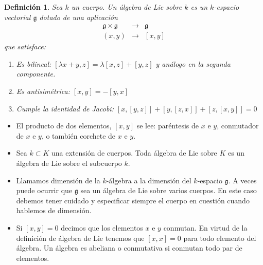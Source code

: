 \documentclass[a4paper,draft,12pt]{scrartcl}
\newtheorem{defi}{Definición}[section]%
\newcommand{\g}{\mathfrak{g}}%
\newcommand{\lto}{\longrightarrow}%
\newcommand{\df}[1]{\textsf{\color{blue}#1}}
\begin{document}
\begin{defi}

Sea  $k$  un cuerpo. Un  \df{álgebra de Lie}  sobre  $k$ es un  $k$-espacio vectorial $\g$ dotado de una aplicación
\[
\begin{array}{ccc}
 \g \times \g & \lto & \g \\
  (x,y)& \lto & [x,y]
\end{array}
\]
que satisface:

\begin{enumerate}[\indent 1.-]

 \item  Es bilineal: $[\lambda x+y,z]= \lambda[x,z]+[y,z]$ y análogo en la segunda componente.

\item  Es antisimétrica: $ [x, y ] = - [y,x ]$

\item   Cumple la   \df{identidad de Jacobi}:\label{identidad de Jacobi} $[x,[y,z ]  ] +[y,[z,x ]  ] + [z,[x,y ]  ]=0$ 

\end{enumerate}

\end{defi}




\begin{itemize}

\item El producto de dos elementos, $[x,y]$ se lee: paréntesis de  $x$ e $y$, conmutador de $x$ e $y$,  o también corchete de  $x$ e $y$.

\item Sea $k \subset K$ una extensión de cuerpos.  Toda álgebra de Lie sobre $K$ es un álgebra de Lie sobre el subcuerpo $k$. 

\item Llamamos   \df{dimensión}  de la  $k$-álgebra a la dimensión del  $k$-espacio $\g$.  A veces puede ocurrir que $\g$ sea un álgebra de Lie sobre varios cuerpos. En este caso debemos tener cuidado y especificar siempre el cuerpo en cuestión cuando hablemos de dimensión. 

\item Si $[x,y]=0$  decimos que los elementos  $x$  e  $y$  conmutan. En virtud de la definición de álgebra de Lie tenemos que $[x,x]=0$ para todo elemento del álgebra. Un álgebra es   \df{abeliana} o   \df{conmutativa}   si conmutan todo par de elementos.



\end{itemize}
\end{document}
